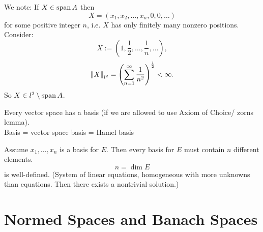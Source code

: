 \begin{beispiele}
\begin{enumerate}[(1)]
		We note: If $X \in \operatorname{span} A$ then
		\[
			X = (x_1,x_2, \dots,x_n,0,0,\dots)
		\]
		for some positive integer $n$, i.e. $X$ has only finitely many nonzero positions. \\
		Consider:
		\[
			X := (1, \frac{1}{2}, \dots, \frac{1}{n}, \dots),
		\]
		\[
			\norm{X}_{l^2} = \left( \sum_{n=1}^{\infty} \frac{1}{n^2} \right)^{\frac{1}{2}} < \infty.
		\]
		So $X \in l^2 \setminus \operatorname{span} A$.
		\end{enumerate}
		\begin{bemerkung}
			Every vector space has a basis (if we are allowed to use Axiom of Choice/ zorns lemma). \\ Basis = vector space basis = Hamel basis
		\end{bemerkung}
		Assume $x_1, \dots,x_n$ is a basis for $E$. Then every basis for $E$ must contain $n$ different elements. 
		\[
			n = \dim E
		\]
		is well-defined. (System of linear equations, homogeneous with more unknowns than equations. Then there exists a nontrivial solution.)
	\end{beispiele}
	
\section{Normed Spaces and Banach Spaces} 
\label{sec:normed_spaces_and_banach_spaces}

